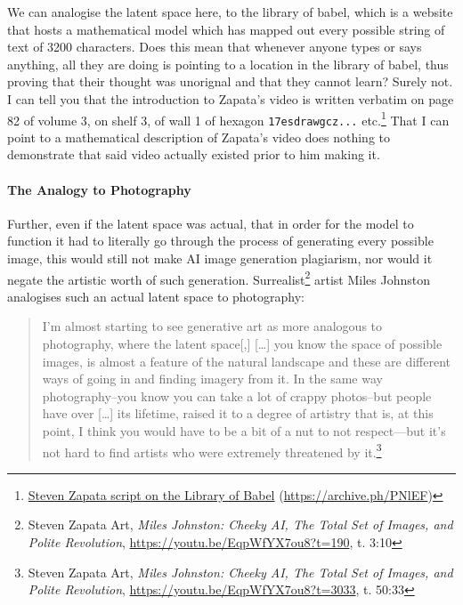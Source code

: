 \documentclass[11pt]{article}
\begin{document}
We can analogise the latent space here, to the library of babel, which is a website that hosts a mathematical model which has mapped out every possible string of text of 3200 characters. Does this mean that whenever anyone types or says anything, all they are doing is pointing to a location in the library of babel, thus proving that their thought was unorignal and that they cannot learn? Surely not. I can tell you that the introduction to Zapata's video is written verbatim on page 82 of volume 3, on shelf 3, of wall 1 of hexagon \texttt{17esdrawgcz...} etc.\footnote{\href{https://libraryofbabel.info/bookmark.cgi?library\_of\_babel\_steven\_zapata\_script}{Steven Zapata script on the Library of Babel} (\url{https://archive.ph/PNlEF})} That I can point to a mathematical description of Zapata's video does nothing to demonstrate that said video actually existed prior to him making it.

\paragraph*{The Analogy to Photography}
\label{sec:orgbdae8f8}
Further, even if the latent space was actual, that in order for the model to function it had to literally go through the process of generating every possible image, this would still not make AI image generation plagiarism, nor would it negate the artistic worth of such generation. Surrealist\footnote{Steven Zapata Art, \emph{Miles Johnston: Cheeky AI, The Total Set of Images, and Polite Revolution}, \url{https://youtu.be/EqpWfYX7ou8?t=190}, t. 3:10} artist Miles Johnston analogises such an actual latent space to photography:
\begin{quote}
I'm almost starting to see generative art as more analogous to photography, where the latent space[,] [\ldots{}] you know the space of possible images, is almost a feature of the natural landscape and these are different ways of going in and finding imagery from it. In the same way photography--you know you can take a lot of crappy photos--but people have over [\ldots{}] its lifetime, raised it to a degree of artistry that is, at this point, I think you would have to be a bit of a nut to not respect---but it's not hard to find artists who were extremely threatened by it.\footnote{Steven Zapata Art, \emph{Miles Johnston: Cheeky AI, The Total Set of Images, and Polite Revolution}, \url{https://youtu.be/EqpWfYX7ou8?t=3033}, t. 50:33}
\end{quote}
\end{document}
